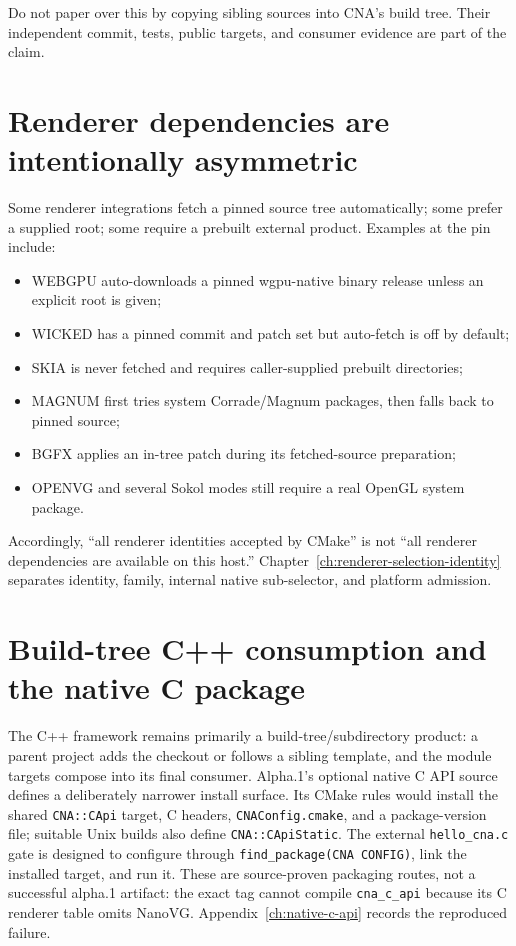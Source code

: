 Do not paper over this by copying sibling sources into CNA's build tree.  Their independent commit,
tests, public targets, and consumer evidence are part of the claim.

\section{Renderer dependencies are intentionally asymmetric}

Some renderer integrations fetch a pinned source tree automatically; some prefer a supplied root;
some require a prebuilt external product.  Examples at the pin include:

\begin{itemize}
  \item WEBGPU auto-downloads a pinned wgpu-native binary release unless an explicit root is given;
  \item WICKED has a pinned commit and patch set but auto-fetch is off by default;
  \item SKIA is never fetched and requires caller-supplied prebuilt directories;
  \item MAGNUM first tries system Corrade/Magnum packages, then falls back to pinned source;
  \item BGFX applies an in-tree patch during its fetched-source preparation;
  \item OPENVG and several Sokol modes still require a real OpenGL system package.
\end{itemize}

Accordingly, “all renderer identities accepted by CMake” is not “all renderer dependencies are
available on this host.”  Chapter~\ref{ch:renderer-selection-identity} separates identity,
family, internal native sub-selector, and platform admission.

\section{Build-tree C++ consumption and the native C package}

The C++ framework remains primarily a build-tree/subdirectory product: a parent project adds the
checkout or follows a sibling template, and the module targets compose into its final consumer.
Alpha.1's optional native C API source defines a deliberately narrower install surface. Its CMake
rules would install the shared \texttt{CNA::CApi} target, C headers, \texttt{CNAConfig.cmake}, and
a package-version file; suitable Unix builds also define \texttt{CNA::CApiStatic}. The external
\texttt{hello\_cna.c} gate is designed to configure through \texttt{find\_package(CNA CONFIG)},
link the installed target, and run it. These are source-proven packaging routes, not a successful
alpha.1 artifact: the exact tag cannot compile \texttt{cna\_c\_api} because its C renderer table
omits NanoVG. Appendix~\ref{ch:native-c-api} records the reproduced failure.

